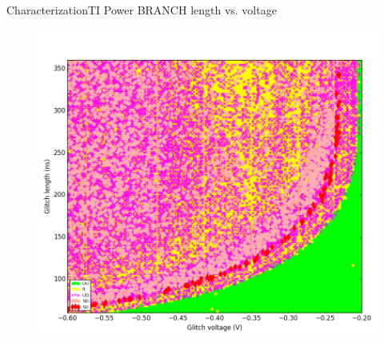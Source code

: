 \documentclass[table]{beamer}
\begin{document}
\begin{frame}{Characterization}{TI Power BRANCH length vs. voltage}
    \vspace{-.3cm}
    \begin{figure}[H]
      \centering
      \includegraphics[width=.7\textwidth]{../../plots/newplots/ti-auth-voltage-length.png}
    \end{figure}
\end{frame}
\end{document}
